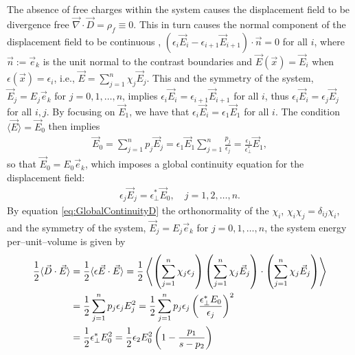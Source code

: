 \documentclass[english,12pt]{ttuthes}
\begin{document}
The absence of free charges within the system causes the displacement
field to be divergence free $\vec{\nabla}\cdot\vec{D}=\rho_f\equiv0$. This in turn
causes the normal component of the displacement field to be continuous
\cite{Jackson-1999}, $(\epsilon_i\vec{E}_i-\epsilon_{i+1}\vec{E}_{i+1})\cdot\vec{n}=0$
for all $i$, where $\vec{n}:=\vec{e}_k$ is the unit normal to the
contrast boundaries and $\vec{E}(\vec{x})=\vec{E}_i$ when
$\epsilon(\vec{x})=\epsilon_i$, i.e., $\vec{E}=\sum_{j=1}^n\chi_j\vec{E}_j$. This and the
symmetry of the system, $\vec{E}_j=E_j\vec{e}_k$ for $j=0,1,\ldots,n$,
implies $\epsilon_i\vec{E}_i=\epsilon_{i+1}\vec{E}_{i+1}$ for all $i$, thus  
$\epsilon_i\vec{E}_i=\epsilon_{j}\vec{E}_{j}$ for all $i,j$. By focusing on $\vec{E}_1$, we
have that $\epsilon_i\vec{E}_i=\epsilon_1\vec{E}_1$ for all $i$. The condition
$\langle\vec{E}\rangle=\vec{E}_0$ then implies  
%
\begin{align}
  \label{eq:perpendicularInvarianceE}
  \vec{E}_0=\sum_{j=1}^np_j\vec{E}_j
   =\epsilon_1\vec{E}_1\sum_{j=1}^n\frac{p_j}{\epsilon_j}
    =\frac{\epsilon_1}{\epsilon^*_\perp}\vec{E}_1,
\end{align}
so that $\vec{E}_0=E_0\vec{e}_k$, which imposes a global continuity
equation for the displacement field:  
%
\begin{align}
  \label{eq:GlobalContinuityD}
  \epsilon_j\vec{E}_j=\epsilon^*_\perp\vec{E}_0, \quad j=1,2,\ldots,n.
\end{align}
%
By equation \eqref{eq:GlobalContinuityD} the orthonormality of the
$\chi_i$, $\chi_i\chi_j=\delta_{ij}\chi_i$, and the symmetry of the system,
$\vec{E}_j=E_j\vec{e}_k$ for $j=0,1,\ldots,n$, the system energy per--unit--volume is
given by   
%
\begin{align}\label{eq:Perp_Lam_Energy}
  \frac{1}{2}\langle\vec{D}\cdot\vec{E}\rangle&= \frac{1}{2}\langle\epsilon\vec{E}\cdot\vec{E}\rangle
             = \frac{1}{2}\left\langle
               \left(\sum_{j=1}^n\chi_j\epsilon_j\right)\left(\sum_{j=1}^n\chi_j\vec{E}_j\right)\cdot
               \left(\sum_{j=1}^n\chi_j\vec{E}_j\right)
                           \right\rangle  \\
             &=\frac{1}{2}\sum_{j=1}^np_j\epsilon_jE_j^2
             =\frac{1}{2}\sum_{j=1}^np_j\epsilon_j\left(\frac{\epsilon^*_\perp E_0}{\epsilon_j}\right)^2
             \notag\\
             &=\frac{1}{2}\epsilon^*_\perp E_0^2
             =\frac{1}{2}\epsilon_2E_0^2\left(1-\frac{p_1}{s-p_2}\right)\notag
\end{align}
\end{document}
